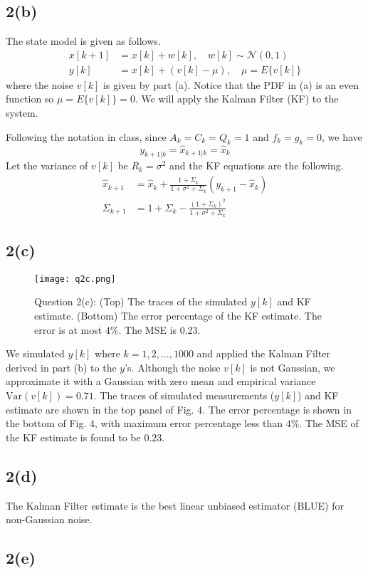 \documentclass[a4paper, 11pt]{article}
\begin{document}
\subsection*{2(b)}

The state model is given as follows. 
\begin{equation}
\begin{split}
x[k+1] & = x[k] + w[k], \quad w[k]\sim\mathcal{N}(0,1)\\
y[k] & = x[k] + \left(v[k] - \mu \right), \quad \mu = E\{v[k]\}
\end{split}
\end{equation}
where the noise $v[k]$ is given by part (a). Notice that the PDF in (a) is an even function so $\mu =  E\{v[k]\} = 0$. We will apply the Kalman Filter (KF) to the system. 

Following the notation in class, since $A_k = C_k = Q_k = 1$ and $f_k = g_k = 0$, we have 
\begin{equation}
y_{k+1|k} = \hat{x}_{k+1|k} = \hat{x}_k
\end{equation}
Let the variance of $v[k]$ be $R_{k}=\sigma^2$ and the KF equations are the following. 
\begin{equation}
\begin{split}
\hat{x}_{k+1} & = \hat{x}_k + \frac{1 + \Sigma_k}{1 + \sigma^2 + \Sigma_k}\left( y_{k+1} - \hat{x}_k \right) \\
\Sigma_{k+1} & = 1 + \Sigma_k - \frac{(1 + \Sigma_k)^2}{1 + \sigma^2 + \Sigma_k}
\end{split}
\end{equation}


\subsection*{2(c)}

\begin{figure}
	\begin{center}
		\texttt{[image: q2c.png]}
		\caption{Question 2(c): (Top) The traces of the simulated $y[k]$ and KF estimate. (Bottom) The error percentage of the KF estimate. The error is at most $4\%$. The MSE is 0.23. }
	\end{center}
\end{figure}

We simulated $y[k]$ where $k=1,2,\dots,1000$ and applied the Kalman Filter derived in part (b) to the $y$'s. Although the noise $v[k]$ is not Gaussian, we approximate it with a Gaussian with zero mean and empirical variance $\text{Var}(v[k]) = 0.71$. The traces of simulated measurements ($y[k]$) and KF estimate are shown in the top panel of Fig. 4. The error percentage is shown in the bottom of Fig. 4, with maximum error percentage less than $4\%$. The MSE of the KF estimate is found to be $0.23$. 



\subsection*{2(d)}

The Kalman Filter estimate is the best linear unbiased estimator (BLUE) for non-Gaussian noise. 



\subsection*{2(e)}
\end{document}
